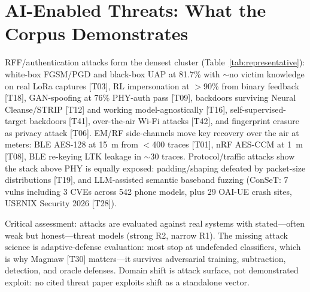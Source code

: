 \section{AI-Enabled Threats: What the Corpus Demonstrates}
\label{sec:threat}
RFF/authentication attacks form the densest cluster (Table~\ref{tab:representative}): white-box FGSM/PGD and black-box UAP at 81.7\% with $\sim$no victim knowledge on real LoRa captures [T03], RL impersonation at $>$90\% from binary feedback [T18], GAN-spoofing at 76\% PHY-auth pass [T09], backdoors surviving Neural Cleanse/STRIP [T12] and working model-agnostically [T16], self-supervised-target backdoors [T41], over-the-air Wi-Fi attacks [T42], and fingerprint erasure as privacy attack [T06]. EM/RF side-channels move key recovery over the air at meters: BLE AES-128 at 15~m from $<$400 traces [T01], nRF AES-CCM at 1~m [T08], BLE re-keying LTK leakage in $\sim$30 traces. Protocol/traffic attacks show the stack above PHY is equally exposed: padding/shaping defeated by packet-size distributions [T19], and LLM-assisted semantic baseband fuzzing (ConSeT: 7 vulns including 3 CVEs across 542 phone models, plus 29 OAI-UE crash sites, USENIX Security 2026 [T28]).

Critical assessment: attacks are evaluated against real systems with stated---often weak but honest---threat models (strong R2, narrow R1). The missing attack science is adaptive-defense evaluation: most stop at undefended classifiers, which is why Magmaw [T30] matters---it survives adversarial training, subtraction, detection, and oracle defenses. Domain shift is attack surface, not demonstrated exploit: no cited threat paper exploits shift as a standalone vector.

